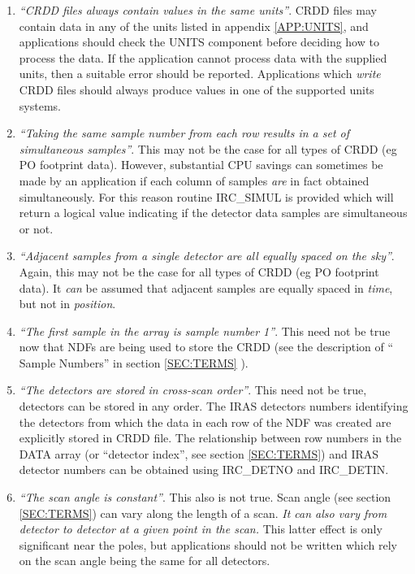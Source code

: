 \begin {enumerate}

\item {\em ``CRDD files always contain values in the same units''}. CRDD files
may contain data in any of the units listed in appendix \ref {APP:UNITS}, and
applications should check the UNITS component before deciding how to process the
data. If the application cannot process data with the supplied units, then a
suitable error should be reported. Applications which {\em write} CRDD files
should always produce values in one of the supported units systems. 

\item {\em ``Taking the same sample number from each row results in a set of
simultaneous samples''}. This may not be the case for all types of CRDD (eg PO
footprint data). However, substantial CPU savings can sometimes be made by an
application if each column of samples {\em are} in fact obtained simultaneously.
For this reason routine IRC\_SIMUL is provided which will return a logical value
indicating if the detector data samples are simultaneous or not. 

\item {\em ``Adjacent samples from a single detector are all equally spaced on 
the sky''}. Again, this may not be the case for all types of CRDD (eg PO
footprint data). It {\em can} be assumed that adjacent samples are equally
spaced in {\em time}, but not in {\em position}. 

\item {\em ``The first sample in the array is sample number 1''}. This need not 
be true now that NDFs are being used to store the CRDD (see the description of 
`` Sample Numbers'' in section \ref {SEC:TERMS} ).

\item {\em ``The detectors are stored in cross-scan order''}. This need not be
true, detectors can be stored in any order. The IRAS detectors numbers
identifying the detectors from which the data in each row of the NDF was created
are explicitly stored in CRDD file. The relationship between row numbers in the
DATA array (or ``detector index'', see section \ref {SEC:TERMS}) and IRAS
detector numbers can be obtained using IRC\_DETNO and IRC\_DETIN. 

\item {\em ``The scan angle is constant''}. This also is not true. Scan angle
(see section \ref{SEC:TERMS}) can vary along the length of a scan. {\em It can
also vary from detector to detector at a given point in the scan.} This latter
effect is only significant near the poles, but applications should not be
written which rely on the scan angle being the same for all detectors. 

\end {enumerate}

